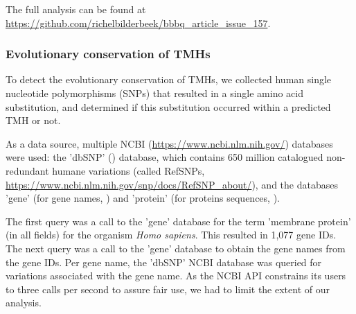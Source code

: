 The full analysis can be found
at \url{https://github.com/richelbilderbeek/bbbq_article_issue_157}.

\subsubsection{Evolutionary conservation of TMHs}


To detect the evolutionary conservation of TMHs,
we collected human single nucleotide polymorphisms (SNPs)
that resulted in a single amino acid substitution,
and determined if this substitution occurred within a predicted TMH or not.


As a data source, multiple
NCBI (\url{https://www.ncbi.nlm.nih.gov/}) databases were used: the 'dbSNP' (\cite{sherry2001dbsnp}) database,
which contains 650 million 
catalogued non-redundant humane variations (called RefSNPs,
\url{https://www.ncbi.nlm.nih.gov/snp/docs/RefSNP_about/}), and the databases 'gene' (for gene names, \cite{brown2015gene})
and 'protein' (for proteins sequences, \cite{sayers2010database}).


The first query was a call to the 'gene' database for the 
term 'membrane protein' (in all fields) for the organism \emph{Homo sapiens}.
This resulted in 1,077 gene IDs.
The next query was a call to the 'gene' database 
to obtain the gene names from the gene IDs.
Per gene name, the 'dbSNP' NCBI database was queried for 
variations associated with the gene name. 
As the NCBI API constrains its users to three calls per second
to assure fair use, we had to limit the extent of our analysis.

